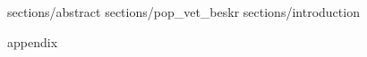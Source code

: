 \documentclass{article}
\begin{document}
	

	 {sections/abstract}
	 {sections/pop_vet_beskr}
		\tableofcontents
	 {sections/introduction}

	
	
	
	 {appendix}
\end{document}
